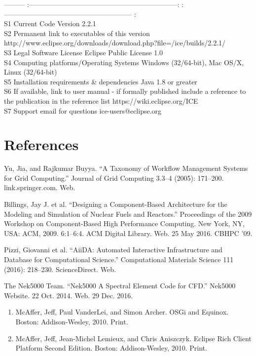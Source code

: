 --------- \textbar{}
:-----------------------------------------------------------------:
\textbar{} :-------------------------------------------------------- :
\textbar{}\\S1 \textbar{} Current Code Version \textbar{} 2.2.1
\textbar{}\\S2 \textbar{} Permanent link to executables of this version
\textbar{}
http://www.eclipse.org/downloads/download.php?file=/ice/builds/2.2.1/
\textbar{}\\S3 \textbar{} Legal Software License \textbar{} Eclipse
Public License 1.0 \textbar{}\\S4 \textbar{} Computing
platforms/Operating Systems \textbar{} Windows (32/64-bit), Mac OS/X,
Linux (32/64-bit) \textbar{}\\S5 \textbar{} Installation requirements \&
dependencies \textbar{} Java 1.8 or greater \textbar{}\\S6 \textbar{} If
available, link to user manual - if formally published include a
reference to the publication in the reference list \textbar{}
https://wiki.eclipse.org/ICE \textbar{}\\S7 \textbar{} Support email for
questions \textbar{} ice-users@eclipse.org \textbar{}

\section{References}\label{references}

Yu, Jia, and Rajkumar Buyya. ``A Taxonomy of Workflow Management Systems
for Grid Computing.'' Journal of Grid Computing 3.3--4 (2005): 171--200.
link.springer.com. Web.

Billings, Jay J. et al. ``Designing a Component-Based Architecture for
the Modeling and Simulation of Nuclear Fuels and Reactors.'' Proceedings
of the 2009 Workshop on Component-Based High Performance Computing. New
York, NY, USA: ACM, 2009. 6:1--6:4. ACM Digital Library. Web. 25 May
2016. CBHPC '09.

Pizzi, Giovanni et al. ``AiiDA: Automated Interactive Infrastructure and
Database for Computational Science.'' Computational Materials Science
111 (2016): 218--230. ScienceDirect. Web.

The Nek5000 Team. ``Nek5000 \textbar{} A Spectral Element Code for
CFD.'' Nek5000 Website. 22 Oct. 2014. Web. 29 Dec. 2016.

\begin{enumerate}
\def\labelenumi{\arabic{enumi}.}
\item
  McAffer, Jeff, Paul VanderLei, and Simon Archer. OSGi and Equinox.
  Boston: Addison-Wesley, 2010. Print.
\item
  McAffer, Jeff, Jean-Michel Lemieux, and Chris Aniszczyk. Eclipse Rich
  Client Platform Second Edition. Boston: Addison-Wesley, 2010. Print.
\end{enumerate}


